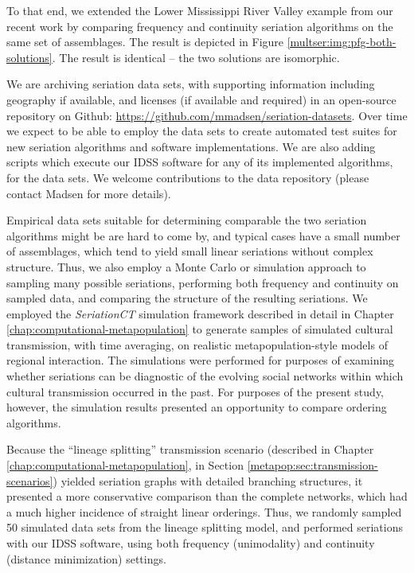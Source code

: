 To that end, we extended the Lower Mississippi River Valley example
from our recent work \citep{Lipo2015} by comparing
frequency and continuity seriation algorithms on the same set of
assemblages.  The result is
depicted in Figure \ref{multser:img:pfg-both-solutions}. The result is identical
-- the two solutions are isomorphic.  

We are archiving seriation data sets, with supporting information including geography 
if available, and licenses (if available
and required) in an open-source repository on Github:  \url{https://github.com/mmadsen/seriation-datasets}.  Over time we expect to be able to employ the data sets to create automated
test suites for new seriation algorithms and software implementations.  We are also adding scripts
which execute our IDSS software for any of its implemented algorithms, for the data sets.  We welcome 
contributions to the data repository (please contact Madsen for more details).  

Empirical data sets suitable for determining comparable the two seriation algorithms might be are hard to come by,
and typical cases have a small number of assemblages, which tend to yield small linear seriations without complex 
structure.  Thus, we also employ a Monte Carlo or simulation approach to sampling many possible seriations, 
performing both frequency and continuity on sampled data, and comparing the structure of the resulting seriations.
We employed the \emph{SeriationCT} simulation framework described in detail in Chapter \ref{chap:computational-metapopulation}
to generate samples of simulated cultural transmission, with time averaging, on realistic metapopulation-style models
of regional interaction.  The simulations were performed for purposes of examining whether seriations can be 
diagnostic of the evolving social networks within which cultural transmission occurred in the past.  For purposes
of the present study, however, the simulation results presented an opportunity to compare ordering algorithms.

Because the ``lineage splitting'' transmission scenario (described in Chapter \ref{chap:computational-metapopulation}, in Section 
\ref{metapop:sec:transmission-scenarios}) yielded seriation graphs with detailed branching structures, it presented a more 
conservative comparison than the complete networks, which had a much higher incidence of straight linear orderings.  Thus,
we randomly sampled 50 simulated data sets from the lineage splitting model, and performed seriations with our IDSS software, using both frequency (unimodality) and continuity (distance minimization) settings.

